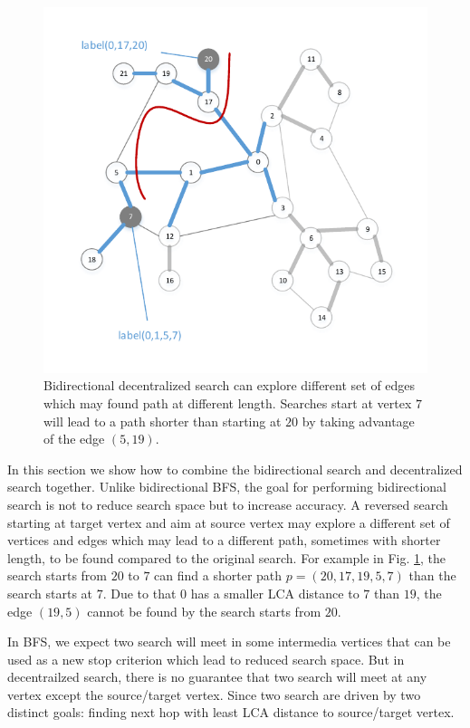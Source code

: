 \begin{figure}[t]
    \centering
    \includegraphics[width=\linewidth]{./figures/new_illustrate/bi_dec.pdf}
    \caption{Bidirectional decentralized search can explore different set of edges which may found path at different length. Searches start at vertex $7$ will lead to a path shorter than starting at $20$ by taking advantage of the edge $(5, 19)$.}
    \label{fig:bi_dec}
\end{figure}

In this section we show how to combine the bidirectional search and decentralized search together. Unlike bidirectional BFS, the goal for performing bidirectional search is not to reduce search space but to increase accuracy. A reversed search starting at target vertex and aim at source vertex may explore a different set of vertices and edges which may lead to a different path, sometimes with shorter length, to be found compared to the original search. For example in Fig. \ref{fig:bi_dec}, the search starts from $20$ to $7$ can find a shorter path $p = (20, 17, 19, 5, 7)$ than the search starts at $7$. Due to that $0$ has a smaller LCA distance to $7$ than $19$, the edge $(19, 5)$ cannot be found by the search starts from $20$. 

In BFS, we expect two search will meet in some intermedia vertices that can be used as a new stop criterion which lead to reduced search space. But in decentrailzed search, there is no guarantee that two search will meet at any vertex except the source/target vertex. Since two search are driven by two distinct goals: finding next hop with least LCA distance to source/target vertex. 

